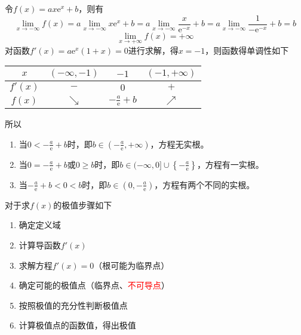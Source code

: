 \begin{solution}
    令$f(x) = ax\mathrm{e}^x+b$，则有
    \[
        \lim_{x\to-\infty}f(x)
        = a\lim_{x\to-\infty} x\mathrm{e}^x + b
        = a\lim_{x\to-\infty} \frac{x}{\mathrm{e}^{-x}} + b
        = a\lim_{x\to-\infty} \frac{1}{-\mathrm{e}^{-x}} + b
        = b
    \]
    \[
        \lim_{x\to+\infty}f(x) = +\infty
    \]
    对函数$f'(x)=a\mathrm{e}^x(1+x)=0$进行求解，得$x=-1$，则函数得单调性如下
    \begin{center}
        \begin{tabular}{|c|c|c|c|}
            \hline
            $x$     & $(-\infty,-1)$ & $-1$                      & $(-1,+\infty)$ \\ \hline
            $f'(x)$ & $-$            & $0$                       & $+$            \\ \hline
            $f(x)$  & $\searrow$     & $-\frac{a}{\mathrm{e}}+b$ & $\nearrow$     \\ \hline
        \end{tabular}
    \end{center}
    所以
    \begin{enumerate}
        \item 当$0 < -\frac{a}{\mathrm{e}}+b$时，即$b\in(-\frac{a}{\mathrm{e}},+\infty)$，方程无实根。
        \item 当$0 = -\frac{a}{\mathrm{e}}+b$或$0 \geq b$时，即$b\in(-\infty,0]\cup \left\{ -\frac{a}{\mathrm{e}} \right\}$，方程有一实根。
        \item 当$-\frac{a}{\mathrm{e}}+b < 0 < b$时，即$b\in(0,-\frac{a}{\mathrm{e}})$，方程有两个不同的实根。
    \end{enumerate}
\end{solution}

对于求$f(x)$的极值步骤如下
\begin{enumerate}
    \item 确定定义域
    \item 计算导函数$f'(x)$
    \item 求解方程$f'(x)=0$（根可能为临界点）
    \item 确定可能的极值点（临界点、\textcolor{red}{不可导点}）
    \item 按照极值的充分性判断极值点
    \item 计算极值点的函数值，得出极值
\end{enumerate}

